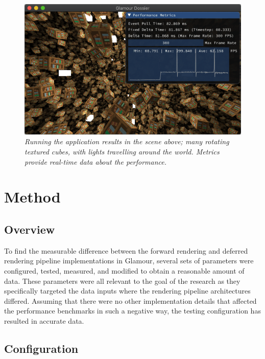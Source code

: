 \documentclass[11pt]{article}
\begin{document}
\begin{figure}[h!]
  \begin{center}
    \includegraphics[width=0.6\columnwidth]{../app-screenshot.png}
  \end{center}
  \caption[Application Screenshot]{
    \emph{
      Running the application results in the scene above; many rotating textured cubes, with lights travelling around the world.
      Metrics provide real-time data about the performance.
    }
  }\label{fig:app-screenshot}
\end{figure}

\section{Method}

\subsection{Overview}
To find the measurable difference between the forward rendering and deferred rendering pipeline implementations in Glamour, several sets of parameters were configured, tested, measured, and modified to obtain a reasonable amount of data.
These parameters were all relevant to the goal of the research as they specifically targeted the data inputs where the rendering pipeline architectures differed.
Assuming that there were no other implementation details that affected the performance benchmarks in such a negative way, the testing configuration has resulted in accurate data.

\subsection{Configuration}
\end{document}
